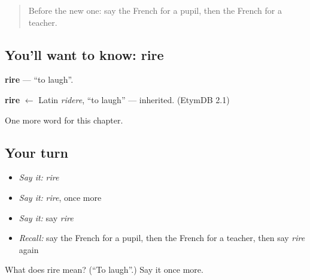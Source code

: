 \begin{quote}
Before the new one: say the French for a pupil, then the French for a teacher.
\end{quote}

\subsection*{You'll want to know: rire}
\textbf{rire} — \textquotedblleft{}to laugh\textquotedblright{}.

\begin{cousinweb}
\textbf{rire} $\leftarrow$ Latin \emph{ridere}, \textquotedblleft{}to laugh\textquotedblright{} — inherited. (EtymDB 2.1)
\end{cousinweb}

\begin{grammarlens}[title={What you've built}]
One more word for this chapter.
\end{grammarlens}

\subsection*{Your turn}
\begin{itemize}
\raggedright
  \item \emph{Say it:} \emph{rire}
  \item \emph{Say it:} \emph{rire}, once more
  \item \emph{Say it:} say \emph{rire}
  \item \emph{Recall:} say the French for a pupil, then the French for a teacher, then say \emph{rire} again
\end{itemize}

\begin{tcolorbox}[breakable,colback=teal!4,colframe=teal!35!black,title={Before you move on}]
What does rire mean? (\textquotedblleft{}To laugh\textquotedblright{}.) Say it once more.
\end{tcolorbox}
